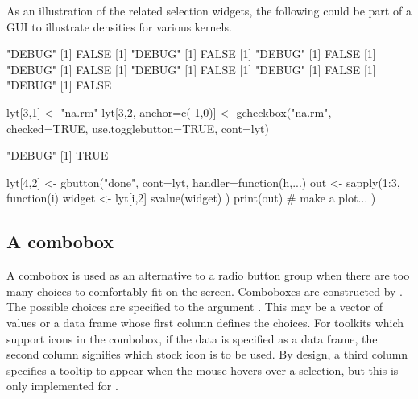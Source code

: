 As an illustration of the related selection widgets, the following
could be part of a GUI to illustrate densities for various kernels.
\begin{Schunk}
\begin{Soutput}
[1] "DEBUG"
[1] FALSE
[1] "DEBUG"
[1] FALSE
[1] "DEBUG"
[1] FALSE
[1] "DEBUG"
[1] FALSE
[1] "DEBUG"
[1] FALSE
[1] "DEBUG"
[1] FALSE
[1] "DEBUG"
[1] FALSE
\end{Soutput}
\begin{Sinput}
 lyt[3,1] <- "na.rm"
 lyt[3,2, anchor=c(-1,0)] <- 
   gcheckbox("na.rm", checked=TRUE, use.togglebutton=TRUE, cont=lyt)
\end{Sinput}
\begin{Soutput}
[1] "DEBUG"
[1] TRUE
\end{Soutput}
\begin{Sinput}
 lyt[4,2] <- gbutton("done", cont=lyt, handler=function(h,...) {
   out <- sapply(1:3, function(i) {
     widget <- lyt[i,2]
     svalue(widget)
   })
   print(out)                            # make a plot...
 })
\end{Sinput}
\end{Schunk}

\subsection{A combobox}
\label{sec:gWidgets-combobox}

A combobox is used as an alternative to a radio button group when
there are too many choices to comfortably fit on the screen. Comboboxes are
constructed by . The possible choices are specified to the argument
. This may be a vector of values or a data
frame whose first column defines the choices. For toolkits which
support icons in the combobox, if the data is specified as a data
frame, the second column signifies which stock icon is to
be used. By design, a third column specifies a tooltip to appear when
the mouse hovers over a selection,
but this is only implemented for .


